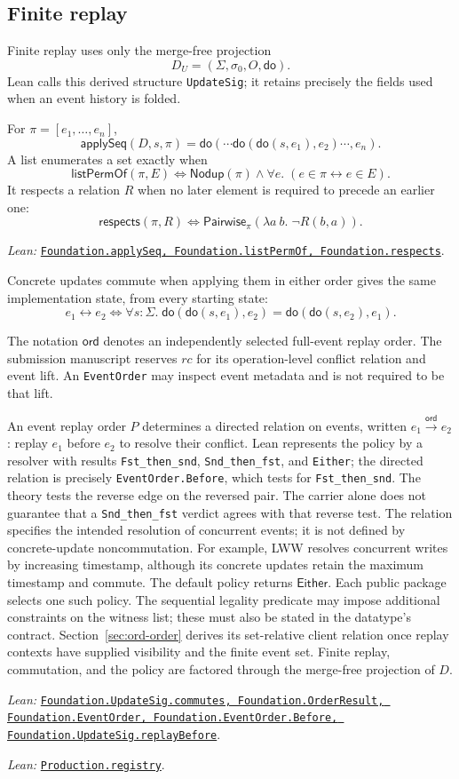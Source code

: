 \documentclass[11pt]{article}
\theoremstyle{definition}
\newcommand{\State}{\Sigma}
\newcommand{\init}{\sigma_0}
\newcommand{\applySeq}{\mathsf{applySeq}}
\newcommand{\doop}{\mathsf{do}}
\newcommand{\ord}{\mathrel{\xrightarrow{\mathsf{ord}}}}
\newcommand{\lean}[1]{\texttt{#1}}
\newcommand{\src}[2]{\href{../../#1}{\texttt{#2}}}
\newcommand{\anchor}[2]{\par\smallskip\noindent\emph{Lean: }\src{#1}{#2}.}
\begin{document}
\subsection{Finite replay}

Finite replay uses only the merge-free projection
\[
 D_U=(\State,\init,O,\doop).
\]
Lean calls this derived structure \lean{UpdateSig}; it retains precisely the
fields used when an event history is folded.

For $\pi=[e_1,\ldots,e_n]$,
\[
 \applySeq(D,s,\pi)
   =\doop(\cdots\doop(\doop(s,e_1),e_2)\cdots,e_n).
\]
A list enumerates a set exactly when
\[
 \mathsf{listPermOf}(\pi,E)
 \Longleftrightarrow
 \mathsf{Nodup}(\pi)\land \forall e.\;(e\in\pi\leftrightarrow e\in E).
\]
It respects a relation $R$ when no later element is required to precede an
earlier one:
\[
 \mathsf{respects}(\pi,R)
 \Longleftrightarrow
 \mathsf{Pairwise}_{\pi}(\lambda a\ b.\;\neg R(b,a)).
\]
\anchor{Sal/MRDTs/Framework/Base/Replay.lean}
  {Foundation.applySeq, Foundation.listPermOf, Foundation.respects}

Concrete updates commute when applying them in either order gives the same
implementation state, from every starting state:
\[
 e_1\leftrightarrow e_2
 \Longleftrightarrow
 \forall s:\State.\;
 \doop(\doop(s,e_1),e_2)=\doop(\doop(s,e_2),e_1).
\]

The notation $\mathsf{ord}$ denotes an independently selected full-event
replay order. The submission manuscript reserves $rc$ for its
operation-level conflict relation and event lift. An \lean{EventOrder}
may inspect event metadata and is not required to be that lift.

An event replay order $P$ determines a directed relation on events, written
$e_1\ord e_2$: replay $e_1$ before $e_2$ to resolve their conflict.
Lean represents the policy by a resolver with results
\lean{Fst\_then\_snd}, \lean{Snd\_then\_fst}, and \lean{Either};
the directed relation is precisely \lean{EventOrder.Before}, which tests
for \lean{Fst\_then\_snd}. The theory tests the reverse edge on the reversed
pair. The carrier alone does not guarantee that a \lean{Snd\_then\_fst}
verdict agrees with that reverse test.
The relation specifies the intended resolution of concurrent events; it is
not defined by concrete-update noncommutation. For example, LWW resolves
concurrent writes by increasing timestamp, although its concrete updates
retain the maximum timestamp and commute. The default policy returns
$\mathsf{Either}$. Each public package selects one such policy. The sequential
legality predicate may impose additional constraints on the witness list;
these must also be stated in the datatype's contract.
Section~\ref{sec:ord-order} derives its set-relative client relation once
replay contexts have supplied visibility and the finite event set. Finite
replay, commutation, and the policy are factored through the merge-free
projection of $D$.
\anchor{Sal/MRDTs/Framework/Base/UpdateSignature.lean}
  {Foundation.UpdateSig.commutes, Foundation.OrderResult,
   Foundation.EventOrder, Foundation.EventOrder.Before,
   Foundation.UpdateSig.\allowbreak replayBefore}
\anchor{Sal/MRDTs/Metatheory/ProductionLedger.lean}{Production.registry}
\end{document}
